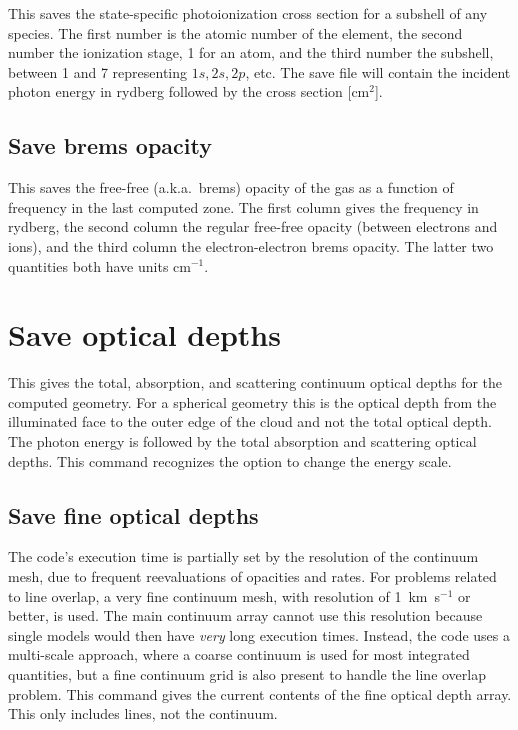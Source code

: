 This saves the state-specific photoionization cross section for a
subshell of any species.  The first number is the atomic number of the
element, the second number the ionization stage, 1 for an atom, and the
third number the subshell, between 1 and 7 representing $1s, 2s, 2p$, etc.
The save file will contain the incident photon energy in rydberg
followed by the cross section [cm$^2$].

\subsection{Save brems opacity}

This saves the free-free (a.k.a.\ brems) opacity of the gas as a function of
frequency in the last computed zone. The first column gives the frequency in
rydberg, the second column the regular free-free opacity (between electrons
and ions), and the third column the electron-electron brems opacity. The
latter two quantities both have units cm$^{-1}$.

\section{Save optical depths}

This gives the total, absorption, and scattering continuum optical depths
for the computed geometry.  For a spherical geometry this is the optical
depth from the illuminated face to the outer edge of the cloud and not the
total optical depth.  The photon energy is followed by the total absorption
and scattering optical depths.
This command recognizes the  option
to change the energy scale.

\subsection{Save fine optical depths}

The code's execution time is partially set by the resolution of the
continuum mesh, due to frequent reevaluations of opacities and rates.
For problems related to line overlap, a very fine continuum mesh, with resolution
of 1~km~s$^{-1}$ or better, is used.
The main continuum array cannot use this
resolution because single models would then have \emph{very} long execution times.
Instead, the code uses a multi-scale approach, where a coarse continuum
is used for most integrated quantities, but a fine continuum grid is also
present to handle the line overlap problem.  This command gives the current
contents of the fine optical depth array.  This only includes lines, not
the continuum.

